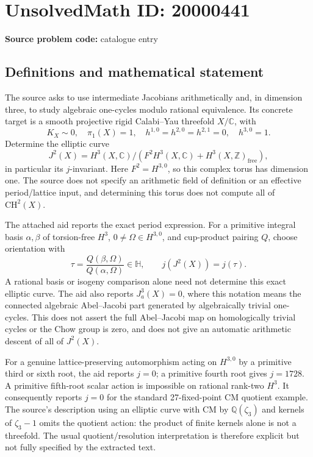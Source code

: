 \documentclass[11pt]{article}
\newcommand{\Z}{\mathbb{Z}}
\newcommand{\Q}{\mathbb{Q}}
\newcommand{\C}{\mathbb{C}}
\begin{document}
\section*{UnsolvedMath ID: 20000441}
\textbf{Source problem code:} catalogue entry
\subsection{Definitions and mathematical statement}
The source asks to use intermediate Jacobians arithmetically and, in dimension three, to study algebraic one-cycles modulo rational equivalence. Its concrete target is a smooth projective rigid Calabi--Yau threefold \(X/\C\), with
\[
K_X\sim0,\quad\pi_1(X)=1,\quad
h^{1,0}=h^{2,0}=h^{2,1}=0,\quad h^{3,0}=1.
\]
Determine the elliptic curve
\[
J^2(X)=H^3(X,\C)/(F^2H^3(X,\C)+H^3(X,\Z)_{\mathrm{free}}),
\]
in particular its \(j\)-invariant. Here \(F^2=H^{3,0}\), so this complex torus has dimension one. The source does not specify an arithmetic field of definition or an effective period/lattice input, and determining this torus does not compute all of \(\mathrm{CH}^2(X)\).

The attached aid reports the exact period expression. For a primitive integral basis \(\alpha,\beta\) of torsion-free \(H^3\), \(0\ne\Omega\in H^{3,0}\), and cup-product pairing \(Q\), choose orientation with
\[
\tau=\frac{Q(\beta,\Omega)}{Q(\alpha,\Omega)}\in\mathbb H,
\qquad j(J^2(X))=j(\tau).
\]
A rational basis or isogeny comparison alone need not determine this exact elliptic curve. The aid also reports \(J_a^3(X)=0\), where this notation means the connected algebraic Abel--Jacobi part generated by algebraically trivial one-cycles. This does not assert the full Abel--Jacobi map on homologically trivial cycles or the Chow group is zero, and does not give an automatic arithmetic descent of all of \(J^2(X)\).

For a genuine lattice-preserving automorphism acting on \(H^{3,0}\) by a primitive third or sixth root, the aid reports \(j=0\); a primitive fourth root gives \(j=1728\). A primitive fifth-root scalar action is impossible on rational rank-two \(H^3\). It consequently reports \(j=0\) for the standard 27-fixed-point CM quotient example. The source's description using an elliptic curve with CM by \(\Q(\zeta_3)\) and kernels of \(\zeta_3-1\) omits the quotient action: the product of finite kernels alone is not a threefold. The usual quotient/resolution interpretation is therefore explicit but not fully specified by the extracted text.
\end{document}
